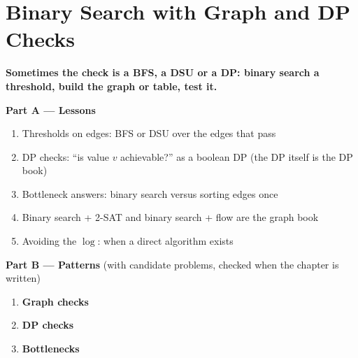 \chapter{Binary Search with Graph and DP Checks}
\label{ch:graph_dp_checks}

\begin{tcolorbox}[enhanced, colback=white, colframe=secondaryblue, boxrule=1pt, arc=2mm]
\textbf{\large\textcolor{primaryblue}{Sometimes the check is a BFS, a DSU or a DP: binary search a threshold, build the graph or table, test it.}}
\end{tcolorbox}


\begin{plannedbox}
\textbf{Part A --- Lessons}
\begin{enumerate}[leftmargin=*, label=\textbf{A\arabic*.}, itemsep=1pt]
    \item Thresholds on edges: BFS or DSU over the edges that pass
    \item DP checks: ``is value $v$ achievable?'' as a boolean DP (the DP itself is the DP book)
    \item Bottleneck answers: binary search versus sorting edges once
    \item Binary search + 2-SAT and binary search + flow are the graph book
    \item Avoiding the $\log$: when a direct algorithm exists
\end{enumerate}
\textbf{Part B --- Patterns} (with candidate problems, checked when the chapter is written)
\begin{enumerate}[leftmargin=*, label=\textbf{P\arabic*.}, itemsep=1pt]
    \item \textbf{Graph checks}
    \item \textbf{DP checks}
    \item \textbf{Bottlenecks}
\end{enumerate}
\end{plannedbox}

